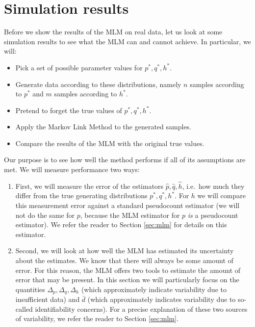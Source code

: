 \section{Simulation results}

Before we show the results of the MLM on real data, let us look at some simulation results to see what the MLM can and cannot achieve.  In particular, we will:

\begin{itemize}
    \item Pick a set of possible parameter values for $p^*,q^*,h^*$.
    \item Generate data according to these distributions, namely $n$ samples according to $p^*$ and $m$ samples according to $h^*$.  
    \item Pretend to forget the true values of $p^*,q^*,h^*$.
    \item Apply the Markov Link Method to the generated samples.
    \item Compare the results of the MLM with the original true values.
\end{itemize}

Our purpose is to see how well the method performs if all of its assumptions are met. We will measure performance two ways:

\begin{enumerate}
    \item First, we will measure the error of the estimators $\hat p,\hat q,\hat h$, i.e.\ how much they differ from the true generating distributions $p^*,q^*,h^*$.  For $h$ we will compare this measurement error against a standard pseudocount estimator (we will not do the same for $p$, because the MLM estimator for $p$ \emph{is} a pseudocount estimator).  We refer the reader to Section \ref{sec:mlm} for details on this estimator.
    \item Second, we will look at how well the MLM has estimated its uncertainty about the estimates.  We know that there will always be some amount of error.  For this reason, the MLM offers two tools to estimate the amount of error that may be present.  In this section we will particularly focus on the quantities $\Delta_p,\Delta_q,\Delta_h$ (which approximately indicate variability due to insufficient data) and $\bar d$ (which approximately indicates variability due to so-called identifiability concerns).  For a precise explanation of these two sources of variability, we refer the reader to Section \ref{sec:mlm}.  
\end{enumerate}

